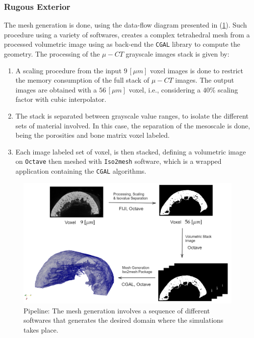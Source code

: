\subsubsection{Rugous Exterior}
The mesh generation is done, using the data-flow diagram presented in (\ref{DiagramMeshGeneration}). Such procedure using a variety of softwares, creates a complex tetrahedral mesh from a processed volumetric image using as back-end the \texttt{CGAL} library to compute the geometry. 
The processing of the $\mu-CT$ grayscale images stack is given by:
\begin{enumerate}
    \item A scaling procedure from the input $9 \, [\mu m]$ voxel images is done to restrict the memory consumption of the full stack of $\mu-CT$ images. The output images are obtained with a $56 \, [\mu m]$ voxel, i.e., considering a $40 \%$ scaling factor with cubic interpolator.
    \item The stack is separated between grayscale value ranges, to isolate the different sets of material involved. In this case, the separation of the mesoscale is done, being the porosities and bone matrix voxel labeled.
    \item Each image labeled set of voxel, is then stacked, defining a volumetric image on \texttt{Octave} then meshed with \texttt{Iso2mesh} software, which is a wrapped application containing the \texttt{CGAL} algorithms.
\end{enumerate}
\begin{figure}[!h]
	\centering
	\includegraphics[scale=.5]{images/ImgExt/DiagramMeshGeneration.png}
	\caption{Pipeline: The mesh generation involves a sequence of different softwares that generates the desired domain where the simulations takes place.}
	\label{DiagramMeshGeneration}
\end{figure} 

